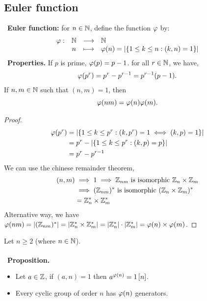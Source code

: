 \subsection{Euler function}
\noindent{}~\textbf{Euler function:} for $n \in  \mathbb{N}$, define the function $\varphi$ by:
\[
\begin{array}{cccl}
      \varphi : &  \mathbb{N}  & \longrightarrow & \mathbb{N} \\

           &  n  & \longmapsto     & \varphi(n)  = 
           \left| \left\{ 1 \leq k \leq n: (k, n)  = 1 \right\} \right|  \\ 
\end{array}
\]
~\textbf{Properties. } If $p$ is prime, $\varphi(p) = p -1$. 
for all $r \in  \mathbb{N}$, we have, 
\[
\varphi( p ^r ) = 
p ^{r} - p ^{r-1} = p ^{r-1} ( p - 1).
\]
If $n,m \in  \mathbb{N}$ such that $(n, m) = 1$, then
\[
\varphi(nm) = \varphi(n)  \varphi(m). 
\]
\begin{proof}
  \begin{align*}
    \varphi(p ^r)  &= 
  \left| \left\{ 1 \leq k \leq p ^{r} : (k, p ^{r}) = 1 \iff 
  (k, p) = 1\right\} \right|  \\
               &= 
               p ^{r} - 
               \left| \left\{ 1 \leq k \leq  p ^{r} : 
               (k, p) = p\right\} \right|  \\
               &= 
               p ^{r} - p ^{r-1}
  \end{align*}
  We can use the chinese remainder theorem, 
  \begin{align*}
    (n, m)  & \implies  1 \implies 
    \mathbb{Z}_{nm}\text{ is isomorphic }  
    \mathbb{Z}_{n} \times \mathbb{Z}_{m}\\
            & \implies  
            (\mathbb{Z}_{nm})^{*} 
            \text{ is isomorphic }
            (\mathbb{Z}_{n} \times \mathbb{Z}_{m} ) ^{*} \\
            & = \mathbb{Z}_{n}^{*}\times \mathbb{Z}_{m}^{*} 
  \end{align*}
  Alternative way, we have $\varphi(nm) = \left| (\mathbb{Z}_{nm}) ^{*} \right| = 
  \left| \mathbb{Z}_{n}^{*} \times \mathbb{Z}_{m} ^{*}  \right| = 
  \left| \mathbb{Z}_{n}^{*} \right| \cdot  
  \left| \mathbb{Z}_{m}^{* } \right| = \varphi(n) \times \varphi(m)$. 
\end{proof}
\noindent Let $n \geq 2$ (where $n \in  \mathbb{N}$).\\
\\
~\textbf{Proposition. }
\begin{itemize}
  \item[\ding{172} ] 
    Let $a \in  \mathbb{Z}$, if $(a, n) = 1$ then $a ^{\varphi(n) } = 1
    \left[ n \right]$.
  \item[\ding{173} ] 
    Every cyclic group of order $n$ has $\varphi(n) $ generators.
\end{itemize}
